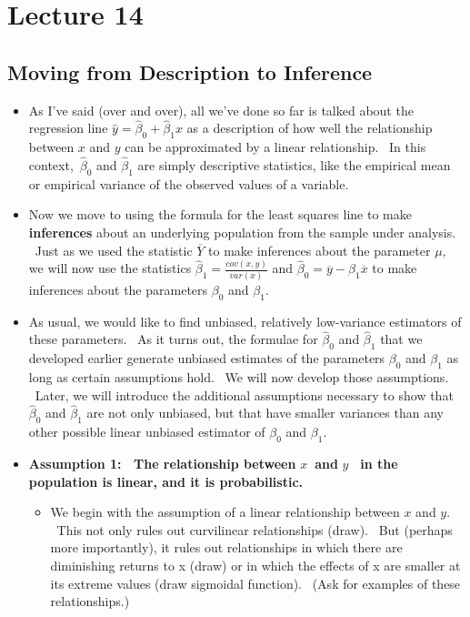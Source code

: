 \documentclass[11pt]{article}
\begin{document}
\section{Lecture 14}

\subsection{Moving from Description to Inference}

\begin{itemize}
\item As I've said (over and over), all we've done so far is talked about
the regression line $\widehat{y}=\widehat{\beta }_{0}+\widehat{\beta }_{1}x$
as a description of how well the relationship between $x$ and $y$ can be
approximated by a linear relationship. \ In this context,\ $\widehat{\beta }%
_{0}$ and $\widehat{\beta }_{1}$ are simply descriptive statistics, like the
empirical mean or empirical variance of the observed values of a variable.

\item Now we move to using the formula for the least squares line to make 
\textbf{inferences }about an underlying population from the sample under
analysis. \ Just as we used the statistic $\overline{Y}$ to make inferences
about the parameter $\mu ,$ we will now use the statistics $\widehat{\beta }%
_{1}=\frac{cov\left( x,y\right) }{var(x)}$ and $\widehat{\beta }_{0}=%
\overline{y}-\widehat{\beta }_{1}\overline{x}$ to make inferences about the
parameters $\beta _{0}$ and $\beta _{1}.$

\item As usual, we would like to find unbiased, relatively low-variance
estimators of these parameters$.$ \ As it turns out, the formulae for $%
\widehat{\beta }_{0}$ and $\widehat{\beta }_{1}$ that we developed earlier
generate unbiased estimates of the parameters $\beta _{0}$ and $\beta _{1}$
as long as certain assumptions hold. \ We will now develop those
assumptions. \ Later, we will introduce the additional assumptions necessary
to show that $\widehat{\beta }_{0}$ and $\widehat{\beta }_{1}$ are not only
unbiased, but that have smaller variances than any other possible linear
unbiased estimator of $\beta _{0}$ and $\beta _{1}.$

\item \textbf{Assumption 1: \ The relationship between }$x$\textbf{\ and }$y$%
\textbf{\ in the population is linear, and it is probabilistic. \ }

\begin{itemize}
\item We begin with the assumption of a linear relationship between $x$ and $%
y$. \ This not only rules out curvilinear relationships (draw). \ But
(perhaps more importantly), it rules out relationships in which there are
diminishing returns to x (draw) or in which the effects of x are smaller at
its extreme values (draw sigmoidal function). \ (Ask for examples of these
relationships.)


\end{itemize}
\end{itemize}
\end{document}
